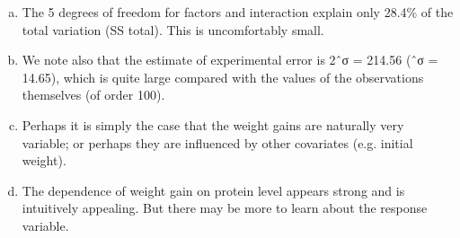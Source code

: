 \documentclass[a4paper,12pt]{article}
\begin{document}
\begin{enumerate}[(a)]
\begin{framed}
\end{framed}
\item The 5 degrees of freedom for factors and interaction explain only 28.4\% of the total variation (SS total). This is uncomfortably small.
\item We note also that the estimate of experimental error is 2ˆσ = 214.56 (ˆσ = 14.65), which is quite large compared with the values of the observations themselves (of order 100).
\item Perhaps it is simply the case that the weight gains are naturally very variable; or perhaps they are influenced by other covariates (e.g. initial weight).
\item 
The dependence of weight gain on protein level appears strong and is intuitively appealing. But there may be more to learn about the response variable.
 \end{enumerate}
 
\end{document}
